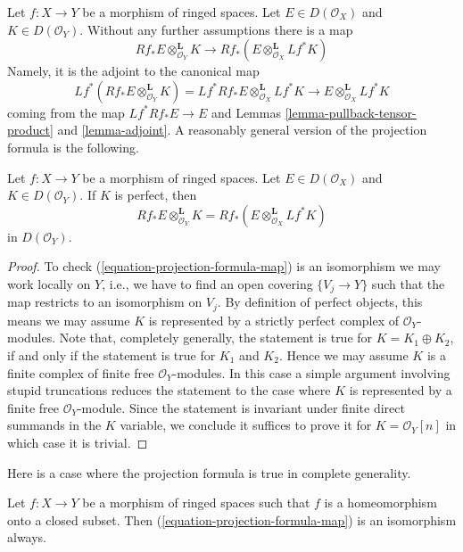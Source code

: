 \noindent
Let $f : X \to Y$ be a morphism of ringed spaces. 
Let $E \in D(\mathcal{O}_X)$ and $K \in D(\mathcal{O}_Y)$.
Without any further assumptions there is a map
\begin{equation}
\label{equation-projection-formula-map}
Rf_*E \otimes^\mathbf{L}_{\mathcal{O}_Y} K
\longrightarrow
Rf_*(E \otimes^\mathbf{L}_{\mathcal{O}_X} Lf^*K)
\end{equation}
Namely, it is the adjoint to the canonical map
$$
Lf^*(Rf_*E \otimes^\mathbf{L}_{\mathcal{O}_Y} K) =
Lf^*Rf_*E \otimes^\mathbf{L}_{\mathcal{O}_X} Lf^*K
\longrightarrow
E \otimes^\mathbf{L}_{\mathcal{O}_X} Lf^*K
$$
coming from the map $Lf^*Rf_*E \to E$ and Lemmas
\ref{lemma-pullback-tensor-product} and \ref{lemma-adjoint}.
A reasonably general version of the projection formula is the following.

\begin{lemma}
\label{lemma-projection-formula-perfect}
Let $f : X \to Y$ be a morphism of ringed spaces.
Let $E \in D(\mathcal{O}_X)$ and $K \in D(\mathcal{O}_Y)$.
If $K$ is perfect, then
$$
Rf_*E \otimes^\mathbf{L}_{\mathcal{O}_Y} K =
Rf_*(E \otimes^\mathbf{L}_{\mathcal{O}_X} Lf^*K)
$$
in $D(\mathcal{O}_Y)$.
\end{lemma}

\begin{proof}
To check (\ref{equation-projection-formula-map}) is an isomorphism
we may work locally on $Y$, i.e., we have to find an open covering
$\{V_j \to Y\}$
such that the map restricts to an isomorphism on $V_j$. By definition
of perfect objects, this means we may assume $K$ is represented by
a strictly perfect complex of $\mathcal{O}_Y$-modules.
Note that, completely generally, the statement is true for
$K = K_1 \oplus K_2$, if and only if the statement is true for
$K_1$ and $K_2$. Hence we may assume $K$ is a finite
complex of finite free $\mathcal{O}_Y$-modules.
In this case a simple argument involving stupid truncations reduces
the statement to the case where $K$ is represented by a finite
free $\mathcal{O}_Y$-module. Since the statement is invariant
under finite direct summands in the $K$ variable, we conclude
it suffices to prove it for $K = \mathcal{O}_Y[n]$
in which case it is trivial.
\end{proof}

\noindent
Here is a case where the projection formula is true in complete
generality.

\begin{lemma}
\label{lemma-projection-formula-closed-immersion}
Let $f : X \to Y$ be a morphism of ringed spaces such that $f$ is a
homeomorphism onto a closed subset. Then
(\ref{equation-projection-formula-map}) is an isomorphism always.
\end{lemma}

